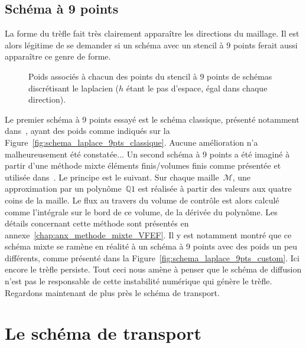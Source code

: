\documentclass[main.tex]{subfiles}
\begin{document}
\subsection{Schéma à 9 points}
La forme du trèfle fait très clairement apparaître les directions du maillage. Il est alors légitime de se demander si un schéma avec un stencil à 9 points ferait aussi apparaître ce genre de forme. 
\begin{figure}
\caption{\label{fig:schema_laplacien}Poids associés à chacun des points du stencil à 9 points de schémas discrétisant le laplacien ($h$ étant le pas d'espace, égal dans chaque direction).}
\end{figure}
Le premier schéma à 9 points essayé est le schéma classique, présenté notamment dans~\cite{leveque2007finite}, ayant des poids comme indiqués sur la Figure~\ref{fig:schema_laplace_9pts_classique}. Aucune amélioration n'a malheureusement été constatée... Un second schéma à 9 points a été imaginé à partir d'une méthode mixte éléments finis/volumes finis comme présentée et utilisée dans~\cite{latige2013second}. Le principe est le suivant.  
Sur chaque maille~$\mathcal{M}$, une approximation par un polynôme~$\mathbb{Q}1$ est réalisée à partir des valeurs aux quatre coins de la maille. Le flux au travers du volume de contrôle est alors calculé comme l'intégrale sur le bord de ce volume, de la dérivée du polynôme. Les détails concernant cette méthode sont présentés en  annexe~\ref{chap:anx_methode_mixte_VFEF}. Il y est notamment montré que ce schéma mixte se ramène en réalité à un schéma à 9 points avec des poids un peu différents, comme présenté dans la Figure~\ref{fig:schema_laplace_9pts_custom}. 
Ici encore le trèfle persiste. Tout ceci nous amène à penser que le schéma de diffusion n'est pas le responsable de cette instabilité numérique qui génère le trèfle. Regardons maintenant de plus près le schéma de transport. 

\section{Le schéma de transport}
\end{document}
